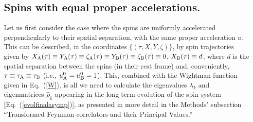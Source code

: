 \documentclass[]{nature}
\begin{document}
{\subsection{Spins with equal proper accelerations.}


Let us first consider the case where the spins are uniformly accelerated  perpendicularly to their spatial separation, with the same proper acceleration $a$. This can be described,  in the  coordinates 
$\{(\tau, X,Y,\zeta)\}$, by spin trajectories given by
$X_{\rm A}(\tau) \equiv Y_{\rm A}(\tau)\equiv \zeta_{\rm A}(\tau)\equiv Y_{\rm B}(\tau)  \equiv \zeta_{\rm B}(\tau) \equiv0$, $X_{\rm B} (\tau)\equiv d$,
where $d$ is the spatial separation between the spins (in their rest frame) and, conveniently,  $\tau \equiv \tau_{\rm A} \equiv \tau_{\rm B}$ (i.e., $u_{\rm A}^0 = u_{\rm B}^0 = 1$).
This, combined with the Wightman function given in Eq.~(\ref{W}), is all we need to calculate the eigenvalues
$\lambda_k$ and eigenmatrices $\hat\rho_k$ appearing in  the long-term 
evolution of the spin system [Eq.~(\ref{evolfinalasymp})], as presented in more detail in the
Methods' subsection ``Transformed Feynman correlators and their Principal Values.''
 


}
\end{document}
